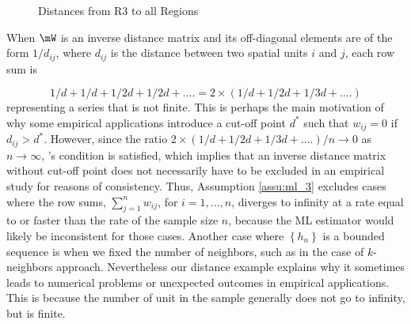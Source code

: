 \documentclass[english,12pt]{book}\usepackage[]{graphicx}\usepackage[]{xcolor}
\begin{document}
\begin{figure}[h]
\caption{Distances from R3 to all Regions}
\label{fig:example_lineal}
\centering
{}
\end{figure}


When $\mW$ is an inverse distance matrix and its off-diagonal elements are of the form $1/d_{ij}$, where $d_{ij}$ is the distance between two spatial units $i$ and $j$, each row sum is

\begin{equation*}
  1/d + 1/d + 1/2d + 1/2d + .... = 2 \times (1/d + 1/2d + 1/3d + ....) 
\end{equation*}
%
representing a series that is not finite. This is perhaps the main motivation of why some empirical applications introduce a cut-off point $d^*$ such that $w_{ij}=0$ if $d_{ij}>d^*$. However, since the ratio $2 \times (1/d + 1/2d + 1/3d + ....)/ n \to 0$ as $n\to \infty$,  \cite{lee2004asymptotic}'s condition is satisfied, which implies that an inverse distance matrix without cut-off point does not necessarily have to be excluded in an empirical study for reasons of consistency. Thus, Assumption \ref{assu:ml_3} excludes cases where the row sums, $\sum_{j = 1}^n w_{ij}$, for $i = 1,...,n$, diverges to infinity at a rate equal to or faster than the rate of the sample size $n$, because the ML estimator would likely be inconsistent for those cases. Another case where $\left\lbrace h_n \right\rbrace$ is a bounded sequence is when we fixed the number of neighbors, such as in the case of $k$-neighbors approach. Nevertheless our distance example explains why it sometimes leads to numerical problems or unexpected outcomes in empirical applications. This is because the number of unit in the sample generally does not go to infinity, but is finite. 



\end{document}
